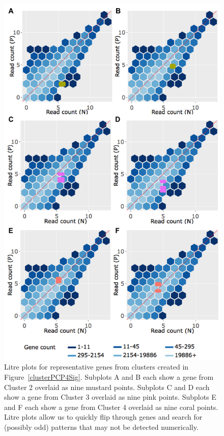 \documentclass{bioinfo}
\begin{document}
\begin{figure}[!tpb]
\centerline{\includegraphics[width=\columnwidth]{../Bioinformatics/Pictures/litrePlots/N_P/litre6LB.png}}
\caption{Litre plots for representative genes from clusters created in Figure~\ref{clusterPCP4Sig}. Subplots A and B each show a gene from Cluster 2 overlaid as nine mustard points. Subplots C and D each show a gene from Cluster 3 overlaid as nine pink points. Subplots E and F each show a gene from Cluster 4 overlaid as nine coral points. Litre plots allow us to quickly flip through genes and search for (possibly odd) patterns that may not be detected numerically.
\label{repDot}}
\end{figure}
\end{document}
